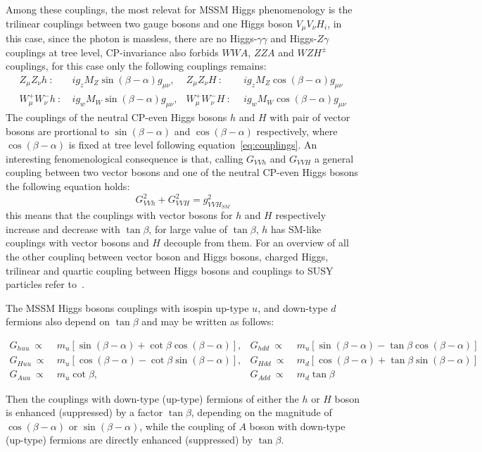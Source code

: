 Among these couplings, the most relevat for MSSM Higgs phenomenology is the trilinear couplings between two gauge bosons and one Higgs boson $V_{\mu}V_{\nu}H_i$,
in this case, since the photon is massless, there are no Higgs-$\gamma\gamma$ and Higgs-$Z\gamma$ couplings at tree level, CP-invariance also forbids $WWA$, $ZZA$
and $WZH^{\pm}$ couplings, for this case only the following couplings remains:
\begin{align} \label{eq:couplings}
Z_{\mu}Z_{\nu} h ~ :  ~ & ig_z M_Z \sin(\beta -\alpha) g_{\mu\nu},  &  Z_{\mu}Z_{\nu} H ~ : ~  ~    & ig_z M_Z \cos(\beta -\alpha) g_{\mu\nu} \\
W_{\mu}^+W_{\nu}^- h ~: ~&  ig_w M_W \sin(\beta -\alpha) g_{\mu\nu},  &  W_{\mu}^+W_{\nu}^- H ~ : ~ ~ & ig_w M_W \cos(\beta -\alpha) g_{\mu\nu}
\end{align}
The couplings of the neutral CP-even Higgs bosons $h$ and $H$ with pair of vector bosons are prortional to $ \sin(\beta -\alpha)$ and $\cos(\beta -\alpha)$
respectively, where $\cos(\beta -\alpha)$ is fixed at tree level following equation~\eqref{eq:couplings}. An interesting fenomenological consequence is
that, calling $G_{VVh}$ and $G_{VVH}$ a general   coupling between two vector bosons and one of the neutral CP-even Higgs bosons the following equation holds:
\begin{equation}\label{eq:couplingSM}
G^2_{VVh} +G^2_{VVH} = g^2_{VVH_{SM}}
\end{equation}
this means that the couplings with vector bosons for $h$ and $H$ respectively increase and decrease with $\tan\beta$, for
large value of $\tan\beta$, $h$ has SM-like couplings with vector bosons and $H$  decouple from them. For an overview of all the other
couplinq between vector boson and Higgs bosons, charged Higgs, trilinear and quartic coupling between Higgs bosons and couplings 
to SUSY particles refer to~\cite{Djuadi}.

The MSSM Higgs bosons couplings with isospin up-type $u$, and down-type $d$ fermions also depend on $\tan\beta$ and may be written
as follows:
\begin{small}
\begin{align*}
G_{huu} ~\propto ~ & m_u [\sin(\beta - \alpha)  + \cot\beta \cos(\beta - \alpha)], & G_{hdd} ~\propto ~ & m_u [\sin(\beta - \alpha)  - \tan\beta \cos(\beta - \alpha)]\\
G_{Huu} ~\propto ~& m_u [\cos(\beta - \alpha)  - \cot\beta \sin(\beta - \alpha)], & G_{Hdd} ~\propto~  & m_d [\cos(\beta - \alpha)  + \tan\beta \sin(\beta - \alpha)]\\
G_{Auu} ~ \propto ~ & m_u  \cot\beta, & G_{Add} ~ \propto ~ & m_d \tan\beta 
\end{align*} 
\end{small}
Then the couplings with down-type (up-type) fermions of either the $h$ or $H$ boson is enhanced (suppressed) by a factor $\tan\beta$, depending
on the magnitude of $\cos(\beta - \alpha)$ or $\sin(\beta - \alpha)$, while the coupling of $A$ boson with down-type (up-type) fermions are directly 
enhanced (suppressed) by $\tan\beta$.


